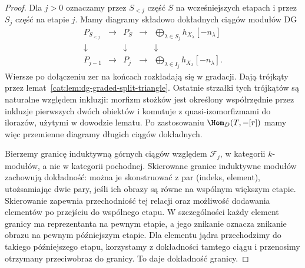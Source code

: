 \begin{proof}
Dla $j>0$ oznaczamy przez $S_{<j}$ część $S$ na wcześniejszych etapach i przez $S_j$ część na etapie $j$. Mamy diagramy składowo dokładnych ciągów modułów DG
\[
\begin{array}{ccccc}
 P_{S_{<j}}&\longrightarrow&P_S&\longrightarrow&
 \displaystyle\bigoplus_{\lambda\in S_j}h_{X_\lambda}[-n_\lambda]\\
 \downarrow&&\downarrow&&\downarrow\\
 P_{j-1}&\longrightarrow&P_j&\longrightarrow&
 \displaystyle\bigoplus_{\lambda\in I_j}h_{X_\lambda}[-n_\lambda].
\end{array}
\]
Wiersze po dołączeniu zer na końcach rozkładają się w gradacji. Dają trójkąty przez lemat~\ref{cat:lem:dg-graded-split-triangle}. Ostatnie strzałki tych trójkątów są naturalne względem inkluzji: morfizm stożków jest określony współrzędnie przez inkluzje pierwszych dwóch obiektów i komutuje z quasi-izomorfizmami do ilorazów, użytymi w dowodzie lematu. Po zastosowaniu $\Hom_D(T,-[r])$ mamy więc przemienne diagramy długich ciągów dokładnych.

Bierzemy granicę induktywną górnych ciągów względem $\mathscr F_j$, w kategorii $k$-modułów, a nie w kategorii pochodnej. Skierowane granice induktywne modułów zachowują dokładność: można je skonstruować z par (indeks, element), utożsamiając dwie pary, jeśli ich obrazy są równe na wspólnym większym etapie. Skierowanie zapewnia przechodniość tej relacji oraz możliwość dodawania elementów po przejściu do wspólnego etapu. W szczególności każdy element granicy ma reprezentanta na pewnym etapie, a jego znikanie oznacza znikanie obrazu na pewnym późniejszym etapie. Dla elementu jądra przechodzimy do takiego późniejszego etapu, korzystamy z dokładności tamtego ciągu i przenosimy otrzymany przeciwobraz do granicy. To daje dokładność granicy.


\end{proof}
